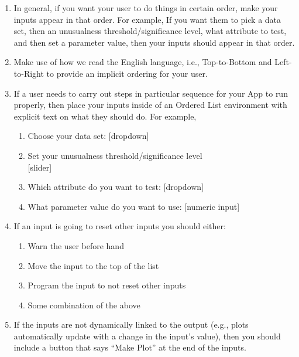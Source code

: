 \documentclass[]{book}
\providecommand{\tightlist}{%
  \setlength{\itemsep}{0pt}\setlength{\parskip}{0pt}}
\begin{document}
\begin{enumerate}
\def\labelenumi{\arabic{enumi}.}
\tightlist
\item
  In general, if you want your user to do things in certain order, make your inputs appear in that order. For example, If you want them to pick a data set, then an unusualness threshold/significance level, what attribute to test, and then set a parameter value, then your inputs should appear in that order.
\item
  Make use of how we read the English language, i.e., Top-to-Bottom and Left-to-Right to provide an implicit ordering for your user.
\item
  If a user needs to carry out steps in particular sequence for your App to run properly, then place your inputs inside of an Ordered List environment with explicit text on what they should do. For example,

  \begin{enumerate}
  \def\labelenumii{\arabic{enumii}.}
  \tightlist
  \item
    Choose your data set: {[}dropdown{]}\\
  \item
    Set your unusualness threshold/significance level\\
    {[}slider{]}\\
  \item
    Which attribute do you want to test: {[}dropdown{]}\\
  \item
    What parameter value do you want to use: {[}numeric input{]}
  \end{enumerate}
\item
  If an input is going to reset other inputs you should either:

  \begin{enumerate}
  \def\labelenumii{\alph{enumii}.}
  \tightlist
  \item
    Warn the user before hand\\
  \item
    Move the input to the top of the list\\
  \item
    Program the input to not reset other inputs\\
  \item
    Some combination of the above\\
  \end{enumerate}
\item
  If the inputs are not dynamically linked to the output (e.g., plots automatically update with a change in the input's value), then you should include a button that says ``Make Plot'' at the end of the inputs.
\end{enumerate}
\end{document}
